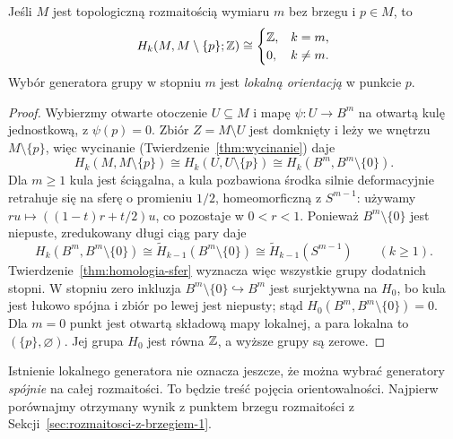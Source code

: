 \begin{stwierdzenie}
\label{prop:lokalna-homologia}
Jeśli $M$ jest topologiczną
rozmaitością wymiaru $m$
bez brzegu i $p\in M$, to
\[
 H_k(M,M\setminus\{p\};\mathbb{Z})
 \cong
 \begin{cases}\mathbb{Z},&k=m,\\0,&k\ne m.\end{cases}
\]
Wybór generatora grupy w stopniu $m$
jest \emph{lokalną orientacją}
w punkcie $p$.
\end{stwierdzenie}
\begin{proof}
Wybierzmy otwarte otoczenie $U\subseteq M$ i mapę
$\psi:U\to B^m$ na otwartą kulę jednostkową,
z $\psi(p)=0$. Zbiór
$Z=M\setminus U$
jest domknięty i leży
we wnętrzu $M\setminus\{p\}$,
więc wycinanie
(Twierdzenie~\ref{thm:wycinanie})
daje
\[
 H_k(M,M\setminus\{p\})
 \cong H_k(U,U\setminus\{p\})
 \cong H_k(B^m,B^m\setminus\{0\}).
\]
Dla $m\geq1$ kula jest
ściągalna, a kula pozbawiona
środka silnie deformacyjnie retrahuje się na sferę
o promieniu $1/2$, homeomorficzną z $S^{m-1}$:
używamy $ru\mapsto((1-t)r+t/2)u$, co pozostaje w $0<r<1$.
Ponieważ $B^m\setminus\{0\}$ jest niepuste, zredukowany
długi ciąg pary daje
\[
 H_k(B^m,B^m\setminus\{0\})
 \cong\widetilde H_{k-1}(B^m\setminus\{0\})
 \cong\widetilde H_{k-1}(S^{m-1})
 \qquad(k\geq1).
\]
Twierdzenie~\ref{thm:homologia-sfer} wyznacza więc wszystkie
grupy dodatnich stopni. W stopniu zero inkluzja
$B^m\setminus\{0\}\hookrightarrow B^m$ jest surjektywna na $H_0$,
bo kula jest łukowo spójna i zbiór po lewej jest niepusty;
stąd $H_0(B^m,B^m\setminus\{0\})=0$.
Dla $m=0$ punkt jest otwartą składową
mapy lokalnej, a para lokalna to $(\{p\},\varnothing)$.
Jej grupa $H_0$ jest równa $\mathbb{Z}$, a wyższe grupy są zerowe.
\end{proof}

Istnienie lokalnego generatora
nie oznacza jeszcze, że można
wybrać generatory \emph{spójnie}
na całej rozmaitości. To będzie
treść pojęcia orientowalności. Najpierw porównajmy
otrzymany wynik z punktem brzegu rozmaitości
z Sekcji~\ref{sec:rozmaitosci-z-brzegiem-1}.

